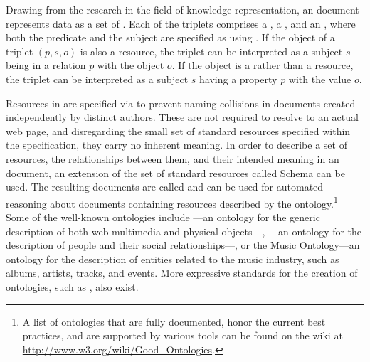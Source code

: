 \documentclass[
  a5paper,10pt,           %
  dvipsnames              %
]{book}
\begin{document}
Drawing from the research in the field of knowledge representation, an
 document represents data as a set of %
. Each of the triplets comprises a
, a %
, and an ,
where both the predicate and the subject are specified as 
 using . If the object of a triplet
$(p,s,o)$ is also a resource, the triplet can be interpreted as a subject $s$
being in a relation $p$ with the object $o$. If the object is a   rather than a resource, the triplet can be
interpreted as a subject $s$ having a property $p$ with the value $o$.

Resources in  are specified via  to prevent naming
collisions in  documents created independently by distinct authors.
These  are not required to resolve to an actual web page, and
disregarding the small set of standard resources specified within the
 specification, they carry no inherent meaning. In order to
describe a set of resources, the relationships between them, and their intended
meaning in an  document, an extension of the set of standard
resources called  Schema \cite{brickley04} can be used. The
resulting documents are called 
 and can be used for automated reasoning about
 documents containing resources described by the
ontology.\footnote{
  A list of ontologies that are fully documented, honor the current best
  practices, and are supported by various tools can be found on the
   wiki at \url{http://www.w3.org/wiki/Good_Ontologies}.
} Some of the well-known ontologies include ---an ontology for the
generic description of both web multimedia and physical objects---,
---an ontology for the description of people and their social
relationships---, or the Music Ontology---an ontology for the description of
entities related to the music industry, such as albums, artists, tracks, and
events. More expressive standards for the creation of ontologies, such as
, also exist.
\end{document}
